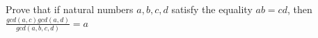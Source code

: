 Prove that if natural numbers $a,b,c,d$ satisfy the equality $ab = cd$, then $\frac{gcd(a,c)gcd(a,d)}{gcd(a,b,c,d)}= a$